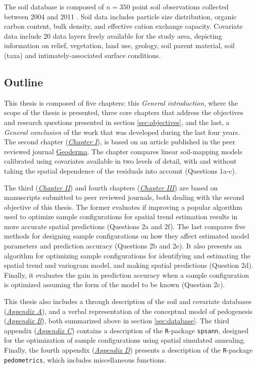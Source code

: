 The soil database is composed of $n=350$ point soil observations collected between 2004 and 2011 
\citep{PedronEtAl2006b, SamuelRosaEtAl2011a, MiguelEtAl2012, Samuel-RosaEtAl2013}. Soil data 
includes particle size distribution, organic carbon content, bulk density, and effective 
cation exchange capacity. Covariate data include 20 data layers freely available for the study area, 
depicting information on relief, vegetation, land use, geology, soil parent material, soil (taxa) 
and intimately-associated surface conditions.

\subsection{Outline}

This thesis is composed of five chapters: this \textit{General introduction}, where the scope of the
thesis is presented, three core chapters that address the objectives and research questions presented
in section \ref{sec:objectives}, and the last, a \textit{General conclusion} of the work that was 
developed during the last four years. The second chapter (\hyperref[chap:chapter01]{\textit{Chapter
I}}), is based on an article published in the peer reviewed journal 
\href{http://www.journals.elsevier.com/geoderma/}{Geoderma}. The chapter compares linear soil-mapping
 models calibrated using covariates available in two levels of detail, with and without taking the 
spatial dependence of the residuals into account (Questions 1a-c).

The third (\hyperref[chap:chapter02]{\textit{Chapter II}}) and fourth chapters 
(\hyperref[chap:chapter03]{\textit{Chapter III}}) are based on manuscripts submitted to peer 
reviewed journals, both dealing with the second objective of this thesis. The 
former evaluates if improving a popular algorithm used to optimize sample configurations for spatial
trend estimation results in more accurate spatial predictions (Questions 2a and 2f). The last 
compares five methods for designing sample configurations on how they affect estimated model 
parameters and prediction accuracy (Questions 2b and 2e). It also presents an algorithm for 
optimizing sample configurations for identifying and estimating the spatial trend and variogram 
model, and making spatial predictions (Question 2d). Finally, it evaluates the gain in prediction 
accuracy when a sample configuration is optimized assuming the form of the model to be known 
(Question 2c).

This thesis also includes a through description of the soil and covariate databases
(\hyperref[apen:database]{\textit{Appendix A}}), and a verbal representation of the conceptual model
of pedogenesis (\hyperref[apen:pedogenesis]{\textit{Appendix B}}), both summarized above in section
\ref{sec:database}. The third appendix (\hyperref[apen:spsann]{\textit{Appendix C}})  contains a 
description of the \texttt{R}-package \texttt{spsann}, designed for the optimization of sample 
configurations using spatial simulated annealing. Finally, the fourth appendix 
(\hyperref[apen:pedometrics]{\textit{Appendix D}}) presents a description of the \texttt{R}-package
 \texttt{pedometrics}, which includes miscellaneous functions.

